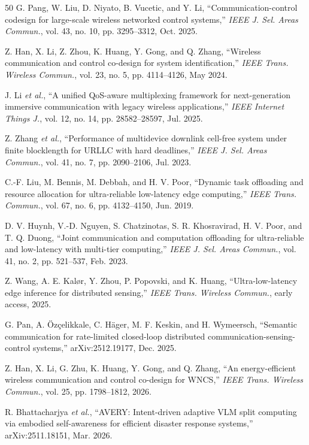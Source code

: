 \documentclass[letterpaper,journal]{IEEEtran}
\newcommand{\etal}{\emph{et al.}}
\begin{document}
\begin{thebibliography}{50}
G. Pang, W. Liu, D. Niyato, B. Vucetic, and Y. Li,
``Communication-control codesign for large-scale wireless networked control
systems,'' \emph{IEEE J. Sel. Areas Commun.}, vol. 43, no. 10,
pp. 3295--3312, Oct. 2025.

Z. Han, X. Li, Z. Zhou, K. Huang, Y. Gong, and Q. Zhang, ``Wireless
communication and control co-design for system identification,'' \emph{IEEE
Trans. Wireless Commun.}, vol. 23, no. 5, pp. 4114--4126, May 2024.

J. Li \etal, ``A unified QoS-aware multiplexing framework for next-generation
immersive communication with legacy wireless applications,'' \emph{IEEE
Internet Things J.}, vol. 12, no. 14, pp. 28582--28597, Jul. 2025.

Z. Zhang \etal, ``Performance of multidevice downlink cell-free system under
finite blocklength for URLLC with hard deadlines,'' \emph{IEEE J. Sel. Areas
Commun.}, vol. 41, no. 7, pp. 2090--2106, Jul. 2023.

C.-F. Liu, M. Bennis, M. Debbah, and H. V. Poor, ``Dynamic task offloading
and resource allocation for ultra-reliable low-latency edge computing,''
\emph{IEEE Trans. Commun.}, vol. 67, no. 6, pp. 4132--4150, Jun. 2019.

D. V. Huynh, V.-D. Nguyen, S. Chatzinotas, S. R. Khosravirad, H. V. Poor,
and T. Q. Duong, ``Joint communication and computation offloading for
ultra-reliable and low-latency with multi-tier computing,'' \emph{IEEE J.
Sel. Areas Commun.}, vol. 41, no. 2, pp. 521--537, Feb. 2023.

Z. Wang, A. E. Kal{\o}r, Y. Zhou, P. Popovski, and K. Huang,
``Ultra-low-latency edge inference for distributed sensing,'' \emph{IEEE
Trans. Wireless Commun.}, early access, 2025.

G. Pan, A. \"Oz\c{c}elikkale, C. H\"ager, M. F. Keskin, and H. Wymeersch,
``Semantic communication for rate-limited closed-loop distributed
communication-sensing-control systems,'' arXiv:2512.19177, Dec. 2025.

Z. Han, X. Li, G. Zhu, K. Huang, Y. Gong, and Q. Zhang, ``An energy-efficient
wireless communication and control co-design for WNCS,'' \emph{IEEE Trans.
Wireless Commun.}, vol. 25, pp. 1798--1812, 2026.

R. Bhattacharjya \etal, ``AVERY: Intent-driven adaptive VLM split computing
via embodied self-awareness for efficient disaster response systems,''
arXiv:2511.18151, Mar. 2026.


\end{thebibliography}
\end{document}
